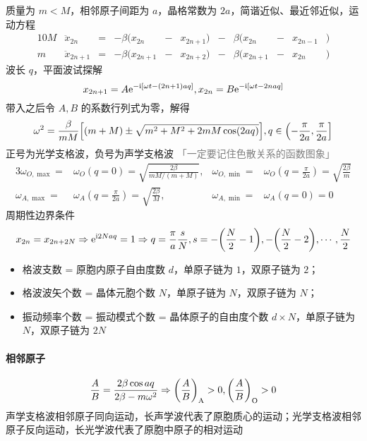 质量为 $m < M$，相邻原子间距为 $a$，晶格常数为 $2 a$，简谐近似、最近邻近似，运动方程
\begin{alignat*}{10}
    M & \ddot{x}_{2 n}     & = & - \beta (x_{2 n}     & - & x_{2 n + 1}) & - & \beta (x_{2 n}     & - & x_{2 n - 1} & ) \\
    m & \ddot{x}_{2 n + 1} & = & - \beta (x_{2 n + 1} & - & x_{2 n + 2}) & - & \beta (x_{2 n + 1} & - & x_{2 n}     & )
\end{alignat*}
波长 $q$，平面波试探解
\[ x_{2 n + 1} = A \mathrm{e}^{- \mathrm{i} [\omega t - (2 n + 1) a q]}, x_{2 n} = B \mathrm{e}^{- \mathrm{i} [\omega t - 2 n a q]} \]
带入之后令 ${A, B}$ 的系数行列式为零，解得
\[ \omega^2 = \frac{\beta}{m M} \qty[(m + M) \pm \sqrt{m^2 + M^2 + 2 m M \cos (2 a q)}], q \in \left(- \frac{\pi}{2 a}, \frac{\pi}{2 a}\right] \]
正号为光学支格波，负号为声学支格波 {\textcolor{gray}{「一定要记住色散关系的函数图象」}}
\begin{alignat*}{3}
    \omega_{O, \max} = & \omega_{O}(q = 0) = \sqrt{\frac{2 \beta}{m M / (m + M)}}    , & \omega_{O, \min} = & \omega_{O}(q = \frac{\pi}{2 a}) = \sqrt{\frac{2 \beta}{m}} \\
    \omega_{A, \max} = & \omega_{A}(q = \frac{\pi}{2 a}) = \sqrt{\frac{2 \beta}{M}}  , & \omega_{A, \min} = & \omega_{A}(q = 0) = 0
\end{alignat*}
周期性边界条件
\[ x_{2 n} = x_{2 n + 2 N} \Rightarrow \mathrm{e}^{\mathrm{i} 2 N a q} = 1 \Rightarrow q = \frac{\pi}{a} \frac{s}{N}, s = - \qty(\frac{N}{2} - 1), - \qty(\frac{N}{2} - 2), \cdots, \frac{N}{2} \]
\begin{itemize}
    \item 格波支数 = 原胞内原子自由度数 $d$，单原子链为 $1$，双原子链为 $2$；
    \item 格波波矢个数 = 晶体元胞个数 $N$，单原子链为 $N$，双原子链为 $N$；
    \item 振动频率个数 = 振动模式个数 = 晶体原子的自由度个数 $d \times N$，单原子链为 $N$，双原子链为 $2 N$
\end{itemize}

\paragraph{相邻原子}

\[ \frac{A}{B} = \frac{2 \beta \cos a q}{2 \beta - m \omega^2} \Rightarrow \qty(\frac{A}{B})_{\text{A}} > 0, \qty(\frac{A}{B})_{\text{O}} > 0 \]
声学支格波相邻原子同向运动，长声学波代表了原胞质心的运动；光学支格波相邻原子反向运动，长光学波代表了原胞中原子的相对运动

